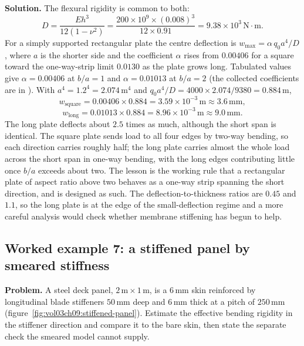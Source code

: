\textbf{Solution.} The flexural rigidity is common to both:
\[
D = \frac{E h^3}{12(1-\nu^2)} = \frac{200\times 10^9\times (0.008)^3}
{12\times 0.91} = 9.38\times 10^3\,\text{N}\cdot\text{m}.
\]
For a simply supported rectangular plate the centre deflection is
$w_{\max} = \alpha\, q_0 a^4/D$, where $a$ is the shorter side and the
coefficient $\alpha$ rises from $0.00406$ for a square toward the
one-way-strip limit $0.0130$ as the plate grows long. Tabulated values
give $\alpha = 0.00406$ at $b/a = 1$ and $\alpha = 0.01013$ at $b/a =
2$ (the collected coefficients are in
). With $a^4 = 1.2^4 = 2.074\,
\text{m}^4$ and $q_0 a^4/D = 4000\times 2.074/9380 = 0.884\,\text{m}$,
\[
w_{\text{square}} = 0.00406\times 0.884 = 3.59\times 10^{-3}\,\text{m}
\approx 3.6\,\si{\milli\meter},
\]
\[
w_{\text{long}} = 0.01013\times 0.884 = 8.96\times 10^{-3}\,\text{m}
\approx 9.0\,\si{\milli\meter}.
\]
The long plate deflects about $2.5$ times as much, although the short
span is identical. The square plate sends load to all four edges by
two-way bending, so each direction carries roughly half; the long
plate carries almost the whole load across the short span in one-way
bending, with the long edges contributing little once $b/a$ exceeds
about two. The lesson is the working rule that a rectangular plate of
aspect ratio above two behaves as a one-way strip spanning the short
direction, and is designed as such. The deflection-to-thickness ratios
are $0.45$ and $1.1$, so the long plate is at the edge of the
small-deflection regime and a more careful analysis would check whether
membrane stiffening has begun to help.

\subsection*{Worked example 7: a stiffened panel by smeared stiffness}



\textbf{Problem.} A steel deck panel, $2\,\si{\meter}\times 1\,
\si{\meter}$, is a $6\,\si{\milli\meter}$ skin reinforced by
longitudinal blade stiffeners $50\,\si{\milli\meter}$ deep and $6\,
\si{\milli\meter}$ thick at a pitch of $250\,\si{\milli\meter}$
(figure~\ref{fig:vol03ch09:stiffened-panel}). Estimate the effective
bending rigidity in the stiffener direction and compare it to the bare
skin, then state the separate check the smeared model cannot supply.


